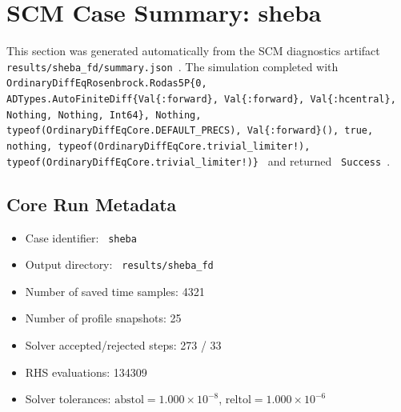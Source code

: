 \section{SCM Case Summary: sheba}
\label{sec:scm_case_sheba_fd_sheba_160x2m_12h_report}

This section was generated automatically from the SCM diagnostics artifact
\texttt{ results/sheba\_fd/summary.json }. The simulation completed with \texttt{ OrdinaryDiffEqRosenbrock.Rodas5P\{0, ADTypes.AutoFiniteDiff\{Val\{:forward\}, Val\{:forward\}, Val\{:hcentral\}, Nothing, Nothing, Int64\}, Nothing, typeof(OrdinaryDiffEqCore.DEFAULT\_PRECS), Val\{:forward\}(), true, nothing, typeof(OrdinaryDiffEqCore.trivial\_limiter!), typeof(OrdinaryDiffEqCore.trivial\_limiter!)\} }
and returned \texttt{ Success }.

\subsection{Core Run Metadata}
\begin{itemize}
  \item Case identifier: \texttt{ sheba }
  \item Output directory: \texttt{ results/sheba\_fd }
  \item Number of saved time samples: 4321
  \item Number of profile snapshots: 25
  \item Solver accepted/rejected steps: 273 / 33
  \item RHS evaluations: 134309
  \item Solver tolerances: $\mathrm{abstol}=1.000 \times 10^{-8}$, $\mathrm{reltol}=1.000 \times 10^{-6}$
\end{itemize}

